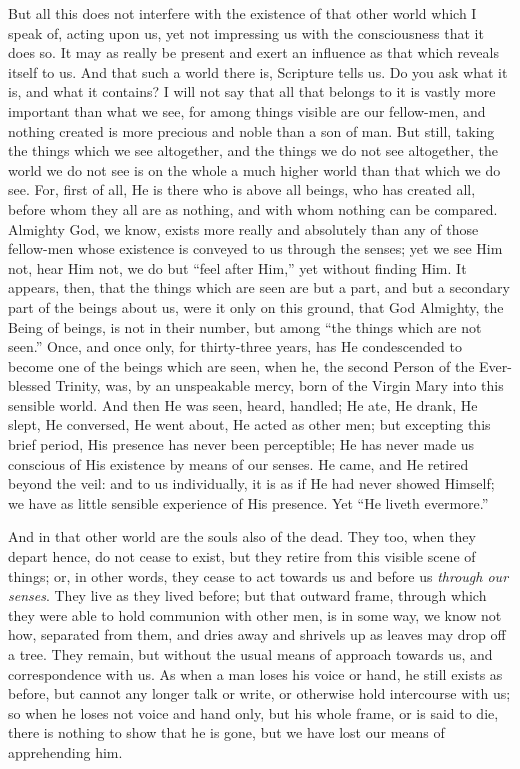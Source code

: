 But all this does not interfere with the existence of that other
world which I speak of, acting upon us, yet not impressing us with the
consciousness that it does so. It may as really be present and exert
an influence as that which reveals itself to us. And that such a world
there is, Scripture tells us. Do you ask what it is, and what it
contains? I will not say that all that belongs to it is vastly more
important than what we see, for among things visible are our
fellow-men, and nothing created is more precious and noble than a son
of man. But still, taking the things which we see altogether, and the
things we do not see altogether, the world we do not see is on the
whole a much higher world than that which we do see. For, first of
all, He is there who is above all beings, who has created all, before
whom they all are as nothing, and with whom nothing can be compared.
Almighty God, we know, exists more really and absolutely than any of
those fellow-men whose existence is conveyed to us through the senses;
yet we see Him not, hear Him not, we do but ``feel after
Him,'' yet without finding Him. It appears, then, that the things
which are seen are but a part, and but a secondary part of the beings
about us, were it only on this ground, that God Almighty, the Being of
beings, is not in their number, but among ``the things which are
not seen.'' Once, and once only, for thirty-three years, has He
condescended to become one of the beings which are seen, when he, the
second Person of the Ever-blessed Trinity, was, by an unspeakable
mercy, born of the Virgin Mary into this sensible world. And then He
was seen, heard, handled; He ate, He drank, He slept, He conversed, He
went about, He acted as other men; but excepting this brief period,
His presence has never been perceptible; He has never made us
conscious of His existence by means of our senses. He came, and He
retired beyond the veil: and to us individually, it is as if He had
never showed Himself; we have as little sensible experience of His
presence. Yet ``He liveth evermore.''

And in that other world are the souls also of the dead. They too,
when they depart hence, do not cease to exist, but they retire from
this visible scene of things; or, in other words, they cease to act
towards us and before us \emph{through our senses}. They live as they
lived before; but that outward frame, through which they were able to
hold communion with other men, is in some way, we know not how,
separated from them, and dries away and shrivels up as leaves may drop
off a tree. They remain, but without the usual means of approach
towards us, and correspondence with us. As when a man loses his voice
or hand, he still exists as before, but cannot any longer talk or
write, or otherwise hold intercourse with us; so when he loses not
voice and hand only, but his whole frame, or is said to die, there is
nothing to show that he is gone, but we have lost our means of
apprehending him.

